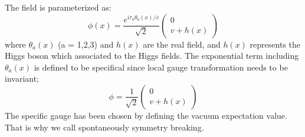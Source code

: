 
The field is parameterized as:
\begin{equation}
\phi(x)=\frac{e^{i \tau_{a} \theta_{a}(x) / v}}{\sqrt{2}}\left(\begin{array}{c}
0 \\
v+h(x)
\end{array}\right)
\end{equation}
where $\theta_{a}(x)$ (a = 1,2,3) and $h(x)$ are the real field, and  $h(x)$ represents the Higgs boson which associated to the Higgs fields. The exponential term including $\theta_{a}(x)$ is defined to be specifical since local gauge transformation needs to be invariant;
\begin{equation}
\phi=\frac{1}{\sqrt{2}}\left(\begin{array}{c}
0 \\
v+h(x)
\end{array}\right)
\end{equation}
The specific gauge has been chosen by defining the vacuum expectation value. That is why we call spontaneously symmetry breaking. 

